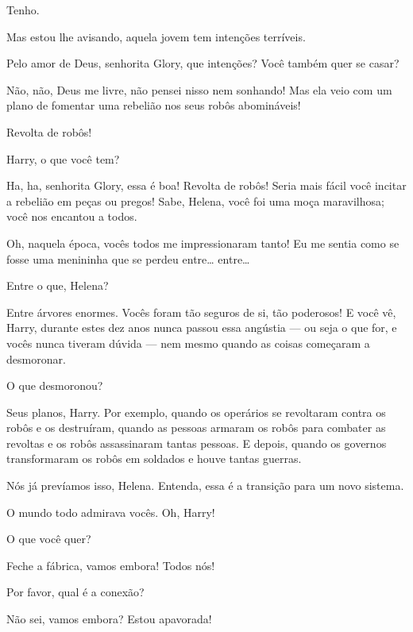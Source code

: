  Tenho.

  Mas estou lhe avisando, aquela jovem
tem intenções terríveis.

 Pelo amor de Deus, senhorita Glory, que intenções? Você também quer se casar?

 Não, não, Deus me livre, não pensei nisso nem sonhando! Mas ela veio com
um plano de fomentar uma rebelião nos seus robôs abomináveis!

  Revolta de robôs!

  Harry, o que você tem?

 Ha, ha, senhorita Glory, essa é boa! Revolta de robôs! Seria mais fácil
você incitar a rebelião em peças ou pregos!  Sabe, Helena, você foi uma
moça maravilhosa; você nos encantou a todos.

  Oh, naquela época, vocês todos me
impressionaram tanto! Eu me sentia como se fosse uma menininha que se perdeu
entre\ldots{} entre\ldots{}

 Entre o que, Helena?

 Entre árvores enormes. Vocês foram tão seguros de si, tão poderosos! E
você vê, Harry, durante estes dez anos nunca passou essa angústia --- ou seja o
que for, e vocês nunca tiveram dúvida --- nem mesmo quando as coisas começaram a
desmoronar.

 O que desmoronou?

 Seus planos, Harry. Por exemplo, quando os operários se revoltaram
contra os robôs e os destruíram, quando as pessoas armaram os robôs para
combater as revoltas e os robôs assassinaram tantas pessoas. E depois, quando  os
governos transformaram os robôs em soldados e houve tantas guerras.

  Nós já prevíamos isso, Helena. Entenda,
essa é a transição para um novo sistema.

 O mundo todo admirava vocês.  Oh, Harry!

 O que você quer?

  Feche a fábrica, vamos embora! Todos nós!

 Por favor, qual é a conexão?

 Não sei, vamos embora? Estou apavorada!


